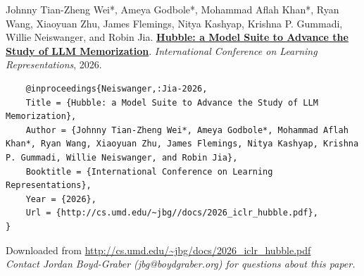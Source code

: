 \documentclass[a4paper]{article}
\begin{document}
    Johnny Tian-Zheng Wei*, Ameya Godbole*, Mohammad Aflah Khan*, Ryan Wang, Xiaoyuan Zhu, James Flemings, Nitya Kashyap, Krishna P. Gummadi, Willie Neiswanger, and Robin Jia.  {\bf \href{http://cs.umd.edu/~jbg//docs/2026_iclr_hubble.pdf}{Hubble: a Model Suite to Advance the Study of LLM Memorization}}.  \emph{International Conference on Learning Representations}, 2026.



    \vspace{5cm}

    \begin{verbatim}
    @inproceedings{Neiswanger,:Jia-2026,
	Title = {Hubble: a Model Suite to Advance the Study of LLM Memorization},
	Author = {Johnny Tian-Zheng Wei*, Ameya Godbole*, Mohammad Aflah Khan*, Ryan Wang, Xiaoyuan Zhu, James Flemings, Nitya Kashyap, Krishna P. Gummadi, Willie Neiswanger, and Robin Jia},
	Booktitle = {International Conference on Learning Representations},
	Year = {2026},
	Url = {http://cs.umd.edu/~jbg//docs/2026_iclr_hubble.pdf},
}

    \end{verbatim}

    

    

    

    \vspace{3cm}
    Downloaded from \url{http://cs.umd.edu/~jbg/docs/2026_iclr_hubble.pdf}  \\

    \vspace{2cm}
    \textit{Contact Jordan Boyd-Graber (jbg@boydgraber.org) for questions about this paper.}

    

    
\end{document}
